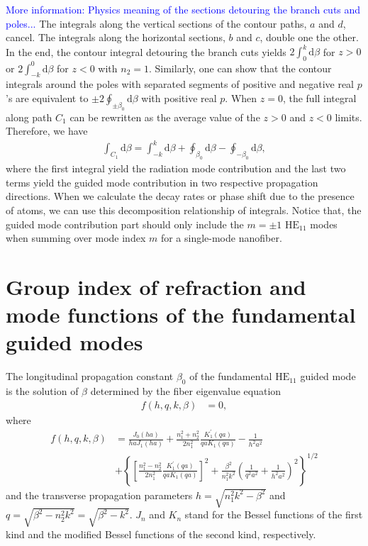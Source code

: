 \documentclass[preprint,aps,pra,onecolumn]{revtex4-1} %
\begin{document}
\textcolor{blue}{More information: Physics meaning of the sections detouring the branch cuts and poles...} The integrals along the vertical sections of the contour paths, $ a $ and $ d $, cancel. The integrals along the horizontal sections, $ b $ and $ c $, double one the other. In the end, the contour integral detouring the branch cuts yields $ 2\int_0^k\mathrm{d}\beta $ for $ z>0 $ or $ 2\int_{-k}^0\mathrm{d}\beta $ for $ z<0 $ with $ n_2=1 $. Similarly, one can show that the contour integrals around the poles with separated segments of positive and negative real $ p $'s are equivalent to $ \pm 2\oint_{\pm \beta_0}\!\!\mathrm{d}\beta $ with positive real $ p $. When $ z=0 $, the full integral along path $ C_1 $ can be rewritten as the average value of the $ z>0 $ and $ z<0 $ limits. Therefore, we have 
\begin{align}
\int_{C_1}\mathrm{d}\beta =\int_{-k}^k\mathrm{d}\beta +\oint_{\beta_0}\mathrm{d}\beta -\oint_{-\beta_0}\!\!\mathrm{d}\beta,
\end{align}
where the first integral yield the radiation mode contribution and the last two terms yield the guided mode contribution in two respective propagation directions. When we calculate the decay rates or phase shift due to the presence of atoms, we can use this decomposition relationship of integrals. Notice that, the guided mode contribution part should only include the $ m=\pm 1 $ $\mathrm{HE}_{11}$ modes when summing over mode index $ m $ for a single-mode nanofiber. 



\section{Group index of refraction and mode functions of the fundamental guided modes}\label{ch:guidedmodes}
The longitudinal propagation constant $\beta_0$ of the fundamental $\mathrm{HE}_{11}$ guided mode is the solution of $\beta$ determined by the fiber eigenvalue equation~\cite{LeKien2005}
\begin{align}
f(h,q,k,\beta) &=0,
\end{align}
where
\begin{align}
f(h,q,k,\beta) &=\frac{J_0(ha)}{haJ_1(ha)}+\frac{n_1^2+n_2^2}{2n_1^2}\frac{K_1^\prime(qa)}{qaK_1(qa)}-\frac{1}{h^2a^2} \\
&+\left\{\left[\frac{n_1^2-n_2^2}{2n_1^2}\frac{K_1^\prime(qa)}{qaK_1(qa)} \right]^2 +\frac{\beta^2}{n_1^2k^2}\left(\frac{1}{q^2a^2}+\frac{1}{h^2a^2} \right)^2 \right\}^{1/2}
\end{align}
and the transverse propagation parameters $h=\sqrt{n_1^2k^2-\beta^2}$ and $q=\sqrt{\beta^2-n_2^2k^2}=\sqrt{\beta^2-k^2}$. $J_n$ and $K_n$ stand for the Bessel functions of the first kind and the modified Bessel functions of the second kind, respectively. 
\end{document}

